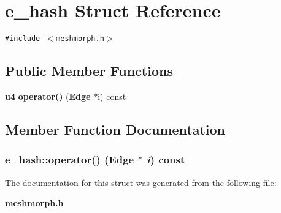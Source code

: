 \section{e\_\-hash Struct Reference}
\label{structe__hash}
{\tt \#include $<$meshmorph.h$>$}

\subsection*{Public Member Functions}
\begin{CompactItemize}
\item 
{\bf u4} {\bf operator()} ({\bf Edge} $\ast$i) const
\end{CompactItemize}


\subsection{Member Function Documentation}
\subsubsection{ e\_\-hash::operator() ({\bf Edge} $\ast$ {\em i}) const\hspace{0.3cm}{\tt  [inline]}}\label{structe__hash_336edd298cf53ab6e7b7d1ee0cdddf20}




The documentation for this struct was generated from the following file:\begin{CompactItemize}
\item 
{\bf meshmorph.h}\end{CompactItemize}
